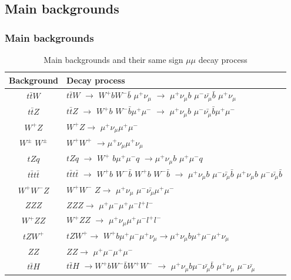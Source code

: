 \documentclass[11pt]{beamer}
\begin{document}
\begin{frame}\subsection{Main backgrounds}
\frametitle{Main backgrounds}
\tiny
\begin{table}
	\caption*{Main backgrounds and their same sign $\mu\mu$ decay process }
\centering
\begin{tabular}{|c|l|}
	\hline
	Background & Decay process \\
	\hline
	$t\bar{t}W$ &$t\bar{t}W$ $\rightarrow$ $W^+ b W^- \bar{b}$ $\mu^+\nu_\mu$ $\rightarrow$ $\mu^+ \nu_\mu b$ $\mu^- \bar{\nu_\mu} \bar{b}$ $\mu^+ \nu_\mu$\\
	\hline
	$t\bar{t} Z$ & $t\bar{t} Z$ $\rightarrow$ $W^+ b$ $W^-\bar{b} \mu^+ \mu^-$ $\rightarrow$ $\mu^+ \nu_\mu b$ $\mu^- \bar{\nu_\mu} \bar{b}\mu^+ \mu^-$ \\
	\hline
	$W^+ Z$ &$W^+ Z \rightarrow$ $\mu^+ \nu_\mu \mu^+ \mu^-$ \\
	\hline 
	$W^\pm$ $W^\pm$ & $W^+W^+$ $\rightarrow$$\mu^+\nu_\mu$$\mu^+ {\nu_\mu}$ \\
	\hline 
	$tZq$ & $tZq$ $\rightarrow$ $W^+$ $ b\mu^+ \mu^- q$ $\rightarrow$$\mu^+ \nu_\mu b$ $\mu^+\mu^- q$ \\
	\hline 
	$t\bar{t}t\bar{t}$ &$t\bar{t}t\bar{t}$ $\rightarrow$ $W^+ b$ $W^- \bar{b}$ $W^+ b$ $W^- \bar{b}$ $\rightarrow$ $\mu^+ \nu_\mu b$ $\mu^- \bar{\nu_\mu} \bar{b}$ $\mu^+ \nu_\mu b$ $\mu^- \bar{\nu_\mu} \bar{b}$ \\
	\hline 
	$W^+ W^- Z$ & $W^+ W^-$ $Z \rightarrow$ $\mu^+ \nu_\mu$ $\mu^- \bar{\nu_\mu} \mu^+ \mu^-$\\
	\hline 
	$ZZZ$ & $ZZZ \rightarrow$ $\mu^+ \mu^-\mu^+ \mu^-l^+ l^-$ \\
	\hline 
	$W^+ZZ$ &$W^+ZZ$ $\rightarrow$ $\mu^+ \nu_\mu \mu^+ \mu^- l^+l^-$ \\
	\hline 
	$tZW^+$ & $tZW^+ \rightarrow$ $W^+b \mu^+ \mu^- \mu^+ \nu_\mu \rightarrow \mu^+ \nu_\mu b \mu^+ \mu^- \mu^+ \nu_\mu$\\
	\hline
	$ZZ$ & $ZZ\rightarrow$ $\mu^+ \mu^- \mu^+ \mu^-$ \\
	\hline
	$t\bar{t}H$	& $t\bar{t}H$ $\rightarrow W^+b W^- \bar{b} W^+W^-$ $\rightarrow$ $\mu^+ \nu_\mu b$$\mu^- \bar{\nu_\mu}\bar{b}$ $\mu^+\nu_\mu$ $\mu^-\bar{\nu_\mu}$\\
	\hline 
\end{tabular}
\label{back}
\end{table} 
\end{frame}
\end{document}
